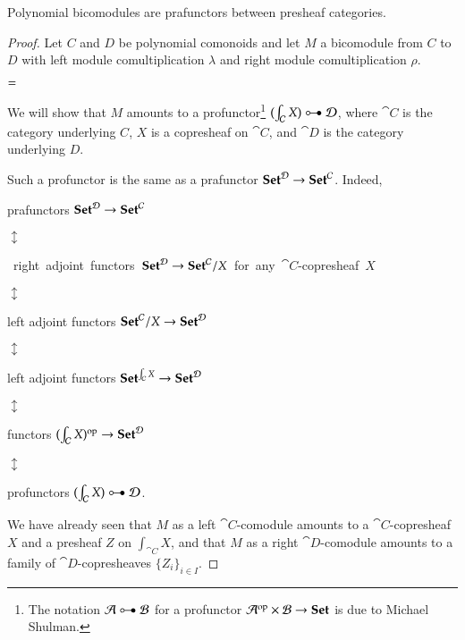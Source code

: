 \documentclass{amsart}
\begin{document}
\begin{prop}
  Polynomial bicomodules are prafunctors between presheaf categories.
\end{prop}
\begin{proof}
  Let $C$ and $D$ be polynomial comonoids and let $M$ a bicomodule from
  $C$ to $D$ with left module comultiplication $\lambda$ and right
  module comultiplication $\rho$.
  \begin{center}
    
    \quad
    $=$
    \quad
    
  \end{center}

  We will show that $M$ amounts to a profunctor\footnote{The notation
    $\cat{A} \prof \cat{B}$ for a profunctor
    $\mathcal{A}^{\mathrm{op}} \times \mathcal{B} \to {\normalfont\mathbf{Set}}$ is due to Michael Shulman.}
  $(\int_{\cat{C}} X) \prof \cat{D}$, where $\cat{C}$ is the category
  underlying $C$, $X$ is a copresheaf on $\cat{C}$, and
  $\cat{D}$ is the category underlying $D$.

  Such a profunctor is the same as a prafunctor
  ${\normalfont\mathbf{Set}}^{\mathcal{D}} \to {\normalfont\mathbf{Set}}^{\mathcal{C}}$. Indeed,
  \begin{center}
    prafunctors ${\normalfont\mathbf{Set}}^{\mathcal{D}} \to {\normalfont\mathbf{Set}}^{\mathcal{C}}$
    
    $\updownarrow$
    
    \vspace{-.2em}\mbox{ right
      adjoint functors ${\normalfont\mathbf{Set}}^{\mathcal{D}} \to {\normalfont\mathbf{Set}}^{\mathcal{C}}/X$
      {\footnotesize for any $\cat{C}$-copresheaf $X$}}
    
    $\updownarrow$
    
    \vspace{-.2em}left adjoint functors ${\normalfont\mathbf{Set}}^{\mathcal{C}}/X \to {\normalfont\mathbf{Set}}^{\mathcal{D}}$
    
    $\updownarrow$
    
    \vspace{-.6em}left adjoint functors ${\normalfont\mathbf{Set}}^{\int_{\mathcal{C}}X} \to {\normalfont\mathbf{Set}}^{\mathcal{D}}$

    $\updownarrow$
    
    functors $(\int_{\mathcal{C}}X)^{\mathrm{op}} \to {\normalfont\mathbf{Set}}^{\mathcal{D}}$

    $\updownarrow$

    profunctors $(\int_{\cat{C}} X) \prof \cat{D}$.
  \end{center}

  We have already seen that $M$ as a left $\cat{C}$-comodule amounts to a
  $\cat{C}$-copresheaf $X$ and a presheaf $Z$ on $\int_{\cat{C}}X$,
  and that $M$ as a right $\cat{D}$-comodule amounts to a family of
  $\cat{D}$-copresheaves $\{Z_i\}_{i \in I}$.


\end{proof}
\end{document}
